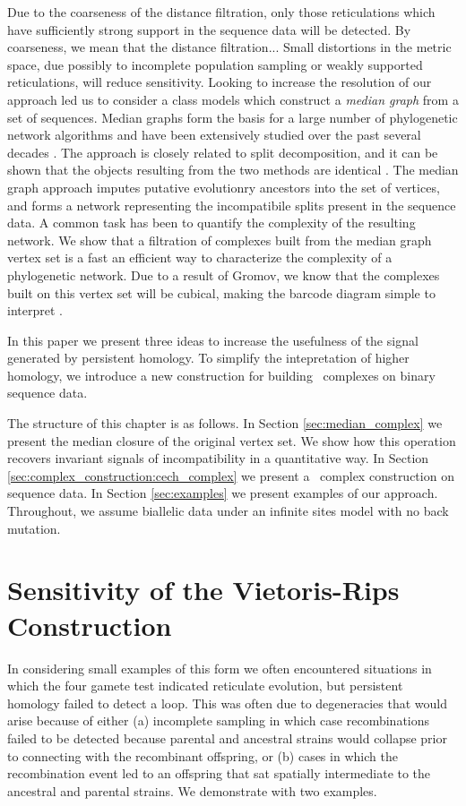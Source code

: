 Due to the coarseness of the distance filtration, only those reticulations which have sufficiently strong support in the sequence data will be detected.
By coarseness, we mean that the distance filtration...
Small distortions in the metric space, due possibly to incomplete population sampling or weakly supported reticulations, will reduce sensitivity.
Looking to increase the resolution of our approach led us to consider a class models which construct a \emph{median graph} from a set of sequences.
Median graphs form the basis for a large number of phylogenetic network algorithms and have been extensively studied over the past several decades \autocite{Bandelt:1999}.
The approach is closely related to split decomposition, and it can be shown that the objects resulting from the two methods are identical \autocite{Bandelt:1992}.
The median graph approach imputes putative evolutionry ancestors into the set of vertices, and forms a network representing the incompatibile splits present in the sequence data.
A common task has been to quantify the complexity of the resulting network.
We show that a filtration of complexes built from the median graph vertex set is a fast an efficient way to characterize the complexity of a phylogenetic network.
Due to a result of Gromov, we know that the complexes built on this vertex set will be cubical, making the barcode diagram simple to interpret \citet{Gromov:1987}.

In this paper we present three ideas to increase the usefulness of the signal generated by persistent homology.
To simplify the intepretation of higher homology, we introduce a new construction for building \Cech\ complexes on binary sequence data.

The structure of this chapter is as follows.
In Section \ref{sec:median_complex} we present the median closure of the original vertex set.
We show how this operation recovers invariant signals of incompatibility in a quantitative way.
In Section \ref{sec:complex_construction:cech_complex} we present a \Cech\ complex construction on sequence data.
In Section \ref{sec:examples} we present examples of our approach.
Throughout, we assume biallelic data under an infinite sites model with no back mutation.

\section{Sensitivity of the Vietoris-Rips Construction}
\label{complex_construction:examples}

In considering small examples of this form we often encountered situations in which the four gamete test indicated reticulate evolution, but persistent homology failed to detect a loop.
This was often due to degeneracies that would arise because of either (a) incomplete sampling in which case recombinations failed to be detected because parental and ancestral strains would collapse prior to connecting with the recombinant offspring, or (b) cases in which the recombination event led to an offspring that sat spatially intermediate to the ancestral and parental strains.
We demonstrate with two examples.

